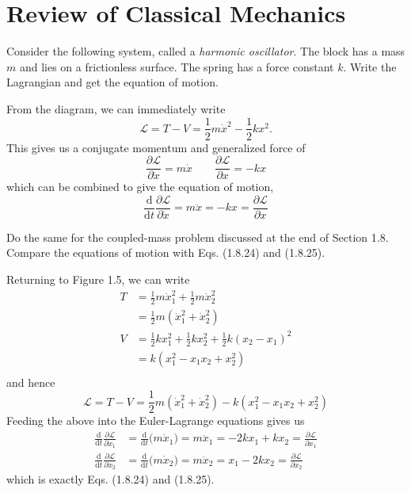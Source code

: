 \documentclass[../principles-of-quantum-mechanics.tex]{subfiles}
\begin{document}
	\printanswers
	
	\section{Review of Classical Mechanics}
	
	\begin{questions}
		
		\question Consider the following system, called a \textit{harmonic oscillator}. The block has a mass $m$ and lies on a frictionless surface. The spring has a force constant $k$. Write the Lagrangian and get the equation of motion.
		
		\begin{solution}
			From the diagram, we can immediately write
			\[
				\mathcal{L} = T - V = \frac{1}{2}m\dot{x}^2 - \frac{1}{2}kx^2.
			\]
			This gives us a conjugate momentum and generalized force of
			\[
				\frac{\partial\mathcal{L}}{\partial{\dot{x}}} = m\dot{x} \qquad \frac{\partial\mathcal{L}}{\partial{x}} = -kx
			\]
			which can be combined to give the equation of motion,
			\[
				\frac{\mathrm{d}}{\mathrm{d}t}\frac{\partial\mathcal{L}}{\partial{\dot{x}}} = m\ddot{x} = -kx = \frac{\partial\mathcal{L}}{\partial{x}}
			\]
		\end{solution}
	
		\question Do the same for the coupled-mass problem discussed at the end of Section 1.8. Compare the equations of motion with Eqs. (1.8.24) and (1.8.25).
		
		\begin{solution}
			Returning to Figure 1.5, we can write
			\begin{align*}
				T &= \frac{1}{2}m\dot{x}_1^2 + \frac{1}{2}m\dot{x}_2^2 \\
				&= \frac{1}{2}m(\dot{x}_1^2 + \dot{x}_2^2) \\
				V &= \frac{1}{2}kx_1^2 + \frac{1}{2}kx_2^2 + \frac{1}{2}k(x_2-x_1)^2 \\
				&= k(x_1^2 - x_1x_2 + x_2^2) \\
			\end{align*}
			and hence
			\[
				\mathcal{L} = T - V = \frac{1}{2}m(\dot{x}_1^2 + \dot{x}_2^2) - k(x_1^2-x_1x_2+x_2^2)
			\]
			Feeding the above into the Euler-Lagrange equations gives us
			\begin{align*}
				\frac{\mathrm{d}}{\mathrm{d}t}\frac{\partial\mathcal{L}}{\partial\dot{x}_1} &= \frac{\mathrm{d}}{\mathrm{d}t}\Big(m\dot{x}_1\Big) = m\ddot{x}_1 = -2kx_1 + kx_2 = \frac{\partial\mathcal{L}}{\partial{x}_1} \\
				\frac{\mathrm{d}}{\mathrm{d}t}\frac{\partial\mathcal{L}}{\partial\dot{x}_2} &= \frac{\mathrm{d}}{\mathrm{d}t}\Big(m\dot{x}_2\Big) = m\ddot{x}_2 = x_1 - 2kx_2 = \frac{\partial\mathcal{L}}{\partial{x}_2}
			\end{align*}
			which is exactly Eqs. (1.8.24) and (1.8.25).
		\end{solution}
	

\end{questions}
\end{document}
